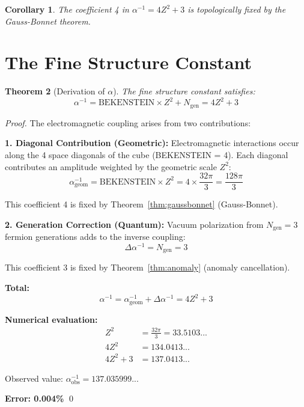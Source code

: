 \documentclass[twocolumn,showpacs,preprintnumbers,amsmath,amssymb,prd]{revtex4-2}
\newtheorem{theorem}{Theorem}[section]
\newtheorem{corollary}[theorem]{Corollary}
\begin{document}
\begin{corollary}
The coefficient 4 in $\alpha^{-1} = 4Z^2 + 3$ is topologically fixed by the Gauss-Bonnet theorem.
\end{corollary}

\section{The Fine Structure Constant}

\begin{theorem}[Derivation of $\alpha$]
\label{thm:alpha}
The fine structure constant satisfies:
\begin{equation}
\boxed{\alpha^{-1} = \text{BEKENSTEIN} \times Z^2 + N_{\text{gen}} = 4Z^2 + 3}
\end{equation}
\end{theorem}

\begin{proof}
The electromagnetic coupling arises from two contributions:

\textbf{1. Diagonal Contribution (Geometric):}
Electromagnetic interactions occur along the 4 space diagonals of the cube (BEKENSTEIN = 4). Each diagonal contributes an amplitude weighted by the geometric scale $Z^2$:
\begin{equation}
\alpha^{-1}_{\text{geom}} = \text{BEKENSTEIN} \times Z^2 = 4 \times \frac{32\pi}{3} = \frac{128\pi}{3}
\end{equation}

This coefficient 4 is fixed by Theorem~\ref{thm:gaussbonnet} (Gauss-Bonnet).

\textbf{2. Generation Correction (Quantum):}
Vacuum polarization from $N_{\text{gen}} = 3$ fermion generations adds to the inverse coupling:
\begin{equation}
\Delta\alpha^{-1} = N_{\text{gen}} = 3
\end{equation}

This coefficient 3 is fixed by Theorem~\ref{thm:anomaly} (anomaly cancellation).

\textbf{Total:}
\begin{equation}
\alpha^{-1} = \alpha^{-1}_{\text{geom}} + \Delta\alpha^{-1} = 4Z^2 + 3
\end{equation}

\textbf{Numerical evaluation:}
\begin{align}
Z^2 &= \frac{32\pi}{3} = 33.5103... \nonumber\\
4Z^2 &= 134.0413... \nonumber\\
4Z^2 + 3 &= 137.0413...
\end{align}

Observed value: $\alpha^{-1}_{\text{obs}} = 137.035999...$

\textbf{Error: 0.004\%} \qed
\end{proof}
\end{document}
